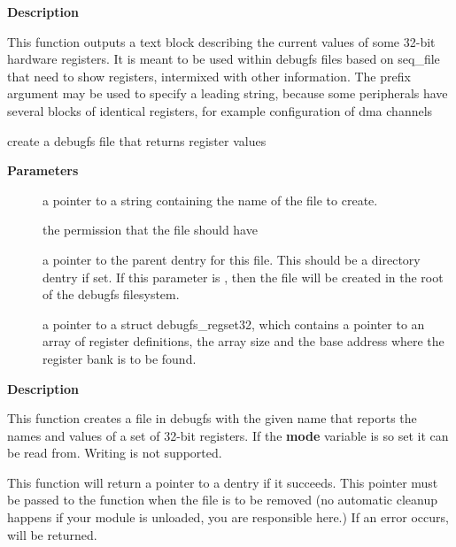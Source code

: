 \documentclass[a4paper,8pt,english]{sphinxmanual}
\begin{document}
\textbf{Description}

This function outputs a text block describing the current values of
some 32-bit hardware registers. It is meant to be used within debugfs
files based on seq\_file that need to show registers, intermixed with other
information. The prefix argument may be used to specify a leading string,
because some peripherals have several blocks of identical registers,
for example configuration of dma channels

\begin{fulllineitems}
\label{filesystems/index:c.debugfs_create_regset32}
create a debugfs file that returns register values

\end{fulllineitems}


\textbf{Parameters}
\begin{description}
\item[{}] \leavevmode
a pointer to a string containing the name of the file to create.

\item[{}] \leavevmode
the permission that the file should have

\item[{}] \leavevmode
a pointer to the parent dentry for this file.  This should be a
directory dentry if set.  If this parameter is , then the
file will be created in the root of the debugfs filesystem.

\item[{}] \leavevmode
a pointer to a struct debugfs\_regset32, which contains a pointer
to an array of register definitions, the array size and the base
address where the register bank is to be found.

\end{description}

\textbf{Description}

This function creates a file in debugfs with the given name that reports
the names and values of a set of 32-bit registers. If the \textbf{mode} variable
is so set it can be read from. Writing is not supported.

This function will return a pointer to a dentry if it succeeds.  This
pointer must be passed to the {\hyperref[filesystems/index:c.debugfs_remove]{\emph{}}} function when the file is
to be removed (no automatic cleanup happens if your module is unloaded,
you are responsible here.)  If an error occurs,  will be returned.
\end{document}
